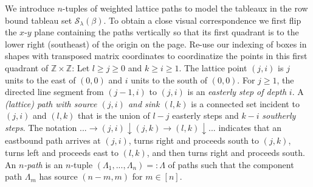 \documentclass[11pt]{article}
\theoremstyle{definition}
\theoremstyle{remark}
\numberwithin{equation}{section}
\begin{document}
\begin{spacing}{1.35}
We introduce $n$-tuples of weighted lattice paths to model the tableaux in the row bound tableau set $\mathcal{S}_\lambda(\beta)$.  To obtain a close visual correspondence we first flip the $x$-$y$ plane containing the paths vertically so that its first quadrant is to the lower right (southeast) of the origin on the page.  Re-use our indexing of boxes in shapes with transposed matrix coordinates to coordinatize the points in this first quadrant of $\mathbb{Z} \times \mathbb{Z}$:  Let $l \geq j \geq 0$ and $k \geq i \geq 1$.  The lattice point $(j,i)$ is $j$ units to the east of $(0,0)$ and $i$ units to the south of $(0,0)$.  For $j \geq 1$, the directed line segment from $(j-1,i)$ to $(j,i)$ is an \emph{easterly step of depth} $i$.  A \emph{(lattice) path with source $(j,i)$ and sink $(l,k)$} is a connected set incident to $(j,i)$ and $(l,k)$ that is the union of $l-j$ easterly steps and $k-i$ \emph{southerly steps}.  The notation $... \rightarrow (j,i) \downarrow (j,k) \rightarrow (l,k) \downarrow ...$ indicates that an eastbound path arrives at $(j,i)$, turns right and proceeds south to $(j,k)$, turns left and proceeds east to $(l,k)$, and then turns right and proceeds south.  An \emph{$n$-path} is an $n$-tuple $(\Lambda_1, ... , \Lambda_n) =: \Lambda$ of paths such that the component path $\Lambda_m$ has source $(n-m,m)$ for $m \in [n]$.




\end{spacing}
\end{document}

